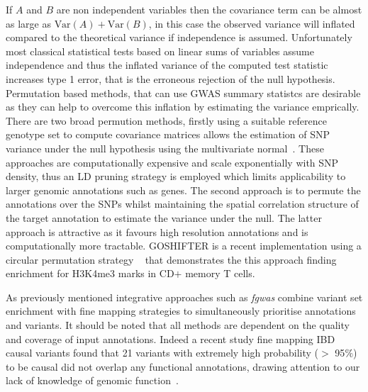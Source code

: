 \documentclass[a4paper,11pt]{report}
\begin{document}
If $A$ and $B$ are non independent variables then the covariance term can be almost as large as $\text{Var}(A) + \text{Var}(B)$, in this case the observed variance will inflated compared to the theoretical variance if independence is assumed. Unfortunately most classical statistical tests based on linear sums of variables assume independence and thus the inflated variance of the computed test statistic increases type 1 error, that is the erroneous rejection of the null hypothesis. Permutation based methods, that can use GWAS summary statistcs are desirable as they can help to overcome this inflation by estimating the variance emprically. There are two broad permution methods, firstly using a suitable reference genotype set to compute covariance matrices allows the estimation of SNP variance under the null hypothesis using the multivariate normal~\cite{LiuMcRaeNyholtEtAl2010,Burren2014-vh}. These approaches are computationally expensive and scale exponentially with SNP density, thus an LD pruning strategy is employed which limits applicability to larger genomic annotations such as genes. The second approach is to permute the annotations over the SNPs whilst maintaining the spatial correlation structure of the target annotation to estimate the variance under the null. The latter approach is attractive as it favours high resolution annotations and is computationally more tractable. GOSHIFTER is a recent implementation using a circular permutation strategy ~\citep{Trynka2015-wz} that demonstrates the this approach finding enrichment for H3K4me3 marks in CD$+$ memory T cells. 

As previously mentioned integrative approaches such as \textit{fgwas} combine variant set enrichment with fine mapping strategies to simultaneously prioritise annotations and variants. It should be noted that all methods are dependent on the quality and coverage of input annotations. Indeed a recent study fine mapping IBD causal variants found that 21 variants with extremely high probability ($>$ 95$\%$) to be causal did not overlap any functional annotations, drawing attention to our lack of knowledge of genomic function~\citep{Huang2015-ug}.

\end{document}

